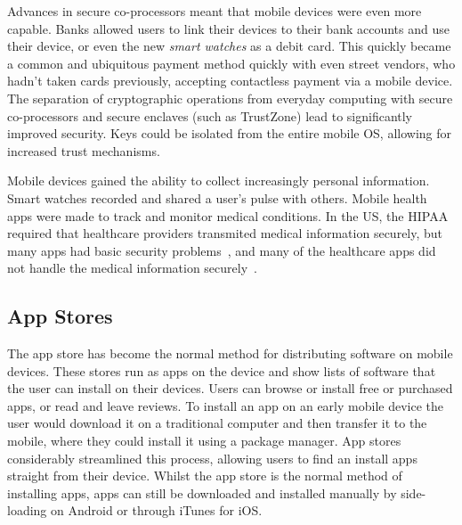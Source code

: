 \documentclass[thesis.tex]{subfiles}
\begin{document}
Advances in secure co-processors meant that mobile devices were even
more capable.  Banks allowed users to link their devices to their bank
accounts and use their device, or even the new \emph{smart watches} as
a debit card.  This quickly became a common and ubiquitous payment
method quickly with even street vendors, who hadn't taken cards
previously, accepting contactless payment via a mobile device.  The
separation of cryptographic operations from everyday computing with
secure co-processors and secure enclaves (such as TrustZone) lead to
significantly improved security.  Keys could be isolated from the
entire mobile OS, allowing for increased trust mechanisms.

Mobile devices gained the ability to collect increasingly personal
information.  Smart watches recorded and shared a user's pulse with
others. Mobile health apps were made to track and monitor medical
conditions. In the US, the \ac{HIPAA} required that healthcare
providers transmited medical information securely, but many apps had
basic security problems~\cite{fahl_why_2012}, and many of the
healthcare apps did not handle the medical information
securely~\cite{knorr_privacy_2015}.

\subsection{App Stores}


The app store has become the normal method for distributing software
on mobile devices.  These stores run as apps on the device and show
lists of software that the user can install on their devices.  Users
can browse or install free or purchased apps, or read and leave
reviews.  To install an app on an early mobile device the user would
download it on a traditional computer and then transfer it to the
mobile, where they could install it using a package manager.  App
stores considerably streamlined this process, allowing users to find
an install apps straight from their device.  Whilst the app store is
the normal method of installing apps, apps can still be downloaded and
installed manually by side-loading on Android or through iTunes for
iOS.
\end{document}
